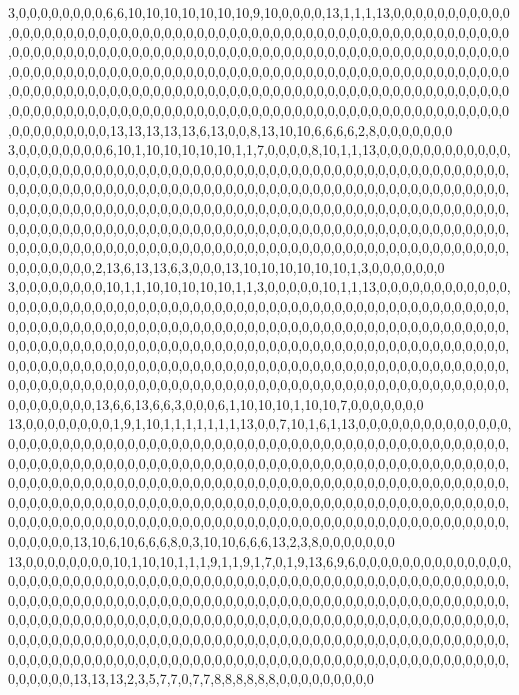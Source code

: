 3,0,0,0,0,0,0,0,0,6,6,10,10,10,10,10,10,10,9,10,0,0,0,0,13,1,1,1,13,0,0,0,0,0,0,0,0,0,0,0,0,0,0,0,0,0,0,0,0,0,0,0,0,0,0,0,0,0,0,0,0,0,0,0,0,0,0,0,0,0,0,0,0,0,0,0,0,0,0,0,0,0,0,0,0,0,0,0,0,0,0,0,0,0,0,0,0,0,0,0,0,0,0,0,0,0,0,0,0,0,0,0,0,0,0,0,0,0,0,0,0,0,0,0,0,0,0,0,0,0,0,0,0,0,0,0,0,0,0,0,0,0,0,0,0,0,0,0,0,0,0,0,0,0,0,0,0,0,0,0,0,0,0,0,0,0,0,0,0,0,0,0,0,0,0,0,0,0,0,0,0,0,0,0,0,0,0,0,0,0,0,0,0,0,0,0,0,0,0,0,0,0,0,0,0,0,0,0,0,0,0,0,0,0,0,0,0,0,0,0,0,0,0,0,0,0,0,0,0,0,0,0,0,0,0,0,0,0,0,0,0,0,0,0,0,0,0,0,0,0,0,0,0,0,0,0,0,0,0,0,0,0,0,0,0,0,0,0,0,0,0,0,0,0,0,0,0,0,0,13,13,13,13,13,6,13,0,0,8,13,10,10,6,6,6,6,2,8,0,0,0,0,0,0,0
3,0,0,0,0,0,0,0,0,6,10,1,10,10,10,10,10,1,1,7,0,0,0,0,8,10,1,1,13,0,0,0,0,0,0,0,0,0,0,0,0,0,0,0,0,0,0,0,0,0,0,0,0,0,0,0,0,0,0,0,0,0,0,0,0,0,0,0,0,0,0,0,0,0,0,0,0,0,0,0,0,0,0,0,0,0,0,0,0,0,0,0,0,0,0,0,0,0,0,0,0,0,0,0,0,0,0,0,0,0,0,0,0,0,0,0,0,0,0,0,0,0,0,0,0,0,0,0,0,0,0,0,0,0,0,0,0,0,0,0,0,0,0,0,0,0,0,0,0,0,0,0,0,0,0,0,0,0,0,0,0,0,0,0,0,0,0,0,0,0,0,0,0,0,0,0,0,0,0,0,0,0,0,0,0,0,0,0,0,0,0,0,0,0,0,0,0,0,0,0,0,0,0,0,0,0,0,0,0,0,0,0,0,0,0,0,0,0,0,0,0,0,0,0,0,0,0,0,0,0,0,0,0,0,0,0,0,0,0,0,0,0,0,0,0,0,0,0,0,0,0,0,0,0,0,0,0,0,0,0,0,0,0,0,0,0,0,0,0,0,0,0,0,0,0,0,0,0,0,2,13,6,13,13,6,3,0,0,0,13,10,10,10,10,10,10,1,3,0,0,0,0,0,0,0
3,0,0,0,0,0,0,0,0,10,1,1,10,10,10,10,10,1,1,3,0,0,0,0,0,10,1,1,13,0,0,0,0,0,0,0,0,0,0,0,0,0,0,0,0,0,0,0,0,0,0,0,0,0,0,0,0,0,0,0,0,0,0,0,0,0,0,0,0,0,0,0,0,0,0,0,0,0,0,0,0,0,0,0,0,0,0,0,0,0,0,0,0,0,0,0,0,0,0,0,0,0,0,0,0,0,0,0,0,0,0,0,0,0,0,0,0,0,0,0,0,0,0,0,0,0,0,0,0,0,0,0,0,0,0,0,0,0,0,0,0,0,0,0,0,0,0,0,0,0,0,0,0,0,0,0,0,0,0,0,0,0,0,0,0,0,0,0,0,0,0,0,0,0,0,0,0,0,0,0,0,0,0,0,0,0,0,0,0,0,0,0,0,0,0,0,0,0,0,0,0,0,0,0,0,0,0,0,0,0,0,0,0,0,0,0,0,0,0,0,0,0,0,0,0,0,0,0,0,0,0,0,0,0,0,0,0,0,0,0,0,0,0,0,0,0,0,0,0,0,0,0,0,0,0,0,0,0,0,0,0,0,0,0,0,0,0,0,0,0,0,0,0,0,0,0,0,0,0,13,6,6,13,6,6,3,0,0,0,6,1,10,10,10,1,10,10,7,0,0,0,0,0,0,0
13,0,0,0,0,0,0,0,0,1,9,1,10,1,1,1,1,1,1,1,13,0,0,7,10,1,6,1,13,0,0,0,0,0,0,0,0,0,0,0,0,0,0,0,0,0,0,0,0,0,0,0,0,0,0,0,0,0,0,0,0,0,0,0,0,0,0,0,0,0,0,0,0,0,0,0,0,0,0,0,0,0,0,0,0,0,0,0,0,0,0,0,0,0,0,0,0,0,0,0,0,0,0,0,0,0,0,0,0,0,0,0,0,0,0,0,0,0,0,0,0,0,0,0,0,0,0,0,0,0,0,0,0,0,0,0,0,0,0,0,0,0,0,0,0,0,0,0,0,0,0,0,0,0,0,0,0,0,0,0,0,0,0,0,0,0,0,0,0,0,0,0,0,0,0,0,0,0,0,0,0,0,0,0,0,0,0,0,0,0,0,0,0,0,0,0,0,0,0,0,0,0,0,0,0,0,0,0,0,0,0,0,0,0,0,0,0,0,0,0,0,0,0,0,0,0,0,0,0,0,0,0,0,0,0,0,0,0,0,0,0,0,0,0,0,0,0,0,0,0,0,0,0,0,0,0,0,0,0,0,0,0,0,0,0,0,0,0,0,0,0,0,0,0,0,0,0,0,0,13,10,6,10,6,6,6,8,0,3,10,10,6,6,6,13,2,3,8,0,0,0,0,0,0,0
13,0,0,0,0,0,0,0,0,10,1,10,10,1,1,1,9,1,1,9,1,7,0,1,9,13,6,9,6,0,0,0,0,0,0,0,0,0,0,0,0,0,0,0,0,0,0,0,0,0,0,0,0,0,0,0,0,0,0,0,0,0,0,0,0,0,0,0,0,0,0,0,0,0,0,0,0,0,0,0,0,0,0,0,0,0,0,0,0,0,0,0,0,0,0,0,0,0,0,0,0,0,0,0,0,0,0,0,0,0,0,0,0,0,0,0,0,0,0,0,0,0,0,0,0,0,0,0,0,0,0,0,0,0,0,0,0,0,0,0,0,0,0,0,0,0,0,0,0,0,0,0,0,0,0,0,0,0,0,0,0,0,0,0,0,0,0,0,0,0,0,0,0,0,0,0,0,0,0,0,0,0,0,0,0,0,0,0,0,0,0,0,0,0,0,0,0,0,0,0,0,0,0,0,0,0,0,0,0,0,0,0,0,0,0,0,0,0,0,0,0,0,0,0,0,0,0,0,0,0,0,0,0,0,0,0,0,0,0,0,0,0,0,0,0,0,0,0,0,0,0,0,0,0,0,0,0,0,0,0,0,0,0,0,0,0,0,0,0,0,0,0,0,0,0,0,0,0,0,13,13,13,2,3,5,7,7,0,7,7,8,8,8,8,8,8,0,0,0,0,0,0,0,0,0
